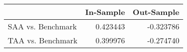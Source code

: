 \begin{tabular}{lrr}
\toprule
{} &  In-Sample &  Out-Sample \\
\midrule
SAA vs. Benchmark &   0.423443 &   -0.323786 \\
TAA vs. Benchmark &   0.399976 &   -0.274740 \\
\bottomrule
\end{tabular}
